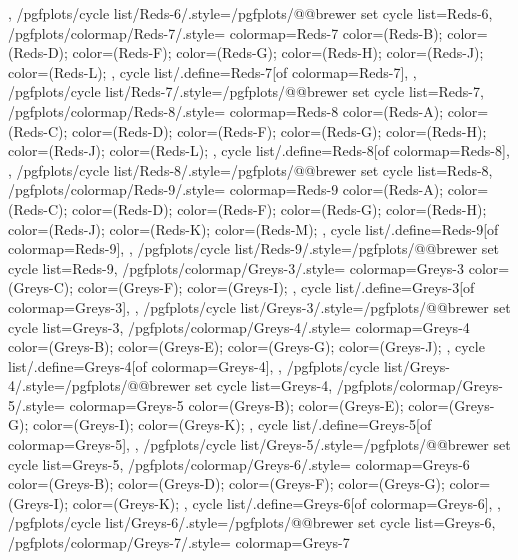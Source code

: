 {{  },
  /pgfplots/cycle list/Reds-6/.style={/pgfplots/@@brewer set cycle list={Reds-6}},
  /pgfplots/colormap/Reds-7/.style={
    colormap={Reds-7}{
      color=(Reds-B);
      color=(Reds-D);
      color=(Reds-F);
      color=(Reds-G);
      color=(Reds-H);
      color=(Reds-J);
      color=(Reds-L);
    },
    cycle list/.define={Reds-7}{[of colormap=Reds-7]},
  },
  /pgfplots/cycle list/Reds-7/.style={/pgfplots/@@brewer set cycle list={Reds-7}},
  /pgfplots/colormap/Reds-8/.style={
    colormap={Reds-8}{
      color=(Reds-A);
      color=(Reds-C);
      color=(Reds-D);
      color=(Reds-F);
      color=(Reds-G);
      color=(Reds-H);
      color=(Reds-J);
      color=(Reds-L);
    },
    cycle list/.define={Reds-8}{[of colormap=Reds-8]},
  },
  /pgfplots/cycle list/Reds-8/.style={/pgfplots/@@brewer set cycle list={Reds-8}},
  /pgfplots/colormap/Reds-9/.style={
    colormap={Reds-9}{
      color=(Reds-A);
      color=(Reds-C);
      color=(Reds-D);
      color=(Reds-F);
      color=(Reds-G);
      color=(Reds-H);
      color=(Reds-J);
      color=(Reds-K);
      color=(Reds-M);
    },
    cycle list/.define={Reds-9}{[of colormap=Reds-9]},
  },
  /pgfplots/cycle list/Reds-9/.style={/pgfplots/@@brewer set cycle list={Reds-9}},
  /pgfplots/colormap/Greys-3/.style={
    colormap={Greys-3}{
      color=(Greys-C);
      color=(Greys-F);
      color=(Greys-I);
    },
    cycle list/.define={Greys-3}{[of colormap=Greys-3]},
  },
  /pgfplots/cycle list/Greys-3/.style={/pgfplots/@@brewer set cycle list={Greys-3}},
  /pgfplots/colormap/Greys-4/.style={
    colormap={Greys-4}{
      color=(Greys-B);
      color=(Greys-E);
      color=(Greys-G);
      color=(Greys-J);
    },
    cycle list/.define={Greys-4}{[of colormap=Greys-4]},
  },
  /pgfplots/cycle list/Greys-4/.style={/pgfplots/@@brewer set cycle list={Greys-4}},
  /pgfplots/colormap/Greys-5/.style={
    colormap={Greys-5}{
      color=(Greys-B);
      color=(Greys-E);
      color=(Greys-G);
      color=(Greys-I);
      color=(Greys-K);
    },
    cycle list/.define={Greys-5}{[of colormap=Greys-5]},
  },
  /pgfplots/cycle list/Greys-5/.style={/pgfplots/@@brewer set cycle list={Greys-5}},
  /pgfplots/colormap/Greys-6/.style={
    colormap={Greys-6}{
      color=(Greys-B);
      color=(Greys-D);
      color=(Greys-F);
      color=(Greys-G);
      color=(Greys-I);
      color=(Greys-K);
    },
    cycle list/.define={Greys-6}{[of colormap=Greys-6]},
  },
  /pgfplots/cycle list/Greys-6/.style={/pgfplots/@@brewer set cycle list={Greys-6}},
  /pgfplots/colormap/Greys-7/.style={
    colormap={Greys-7}{
}}}
